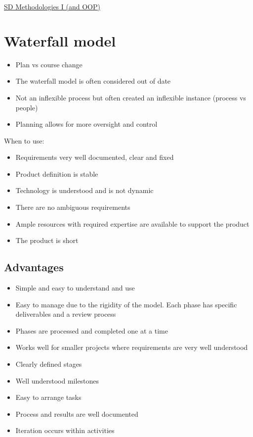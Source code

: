 \documentclass{article}[18pt]
\begin{document}
\begin{center}
\underline{\huge SD Methodologies I (and OOP)}
\end{center}
\section{Waterfall model}
\begin{itemize}
	\item Plan vs course change
	\item The waterfall model is often considered out of date
	\item Not an inflexible process but often created an inflexible instance (process vs people)
	\item Planning allows for more oversight and control
\end{itemize}
When to use:
\begin{itemize}
	\item Requirements very well documented, clear and fixed
	\item Product definition is stable
	\item Technology is understood and is not dynamic
	\item There are no ambiguous requirements
	\item Ample resources with required expertise are available to support the product
	\item The product is short
\end{itemize}
\subsection{Advantages}
\begin{itemize}
	\item Simple and easy to understand and use
	\item Easy to manage due to the rigidity of the model. Each phase has specific deliverables and a review process
	\item Phases are processed and completed one at a time
	\item Works well for smaller projects where requirements are very well understood
	\item Clearly defined stages
	\item Well understood milestones
	\item Easy to arrange tasks
	\item Process and results are well documented
	\item Iteration occurs within activities 
\end{itemize}
\end{document}

